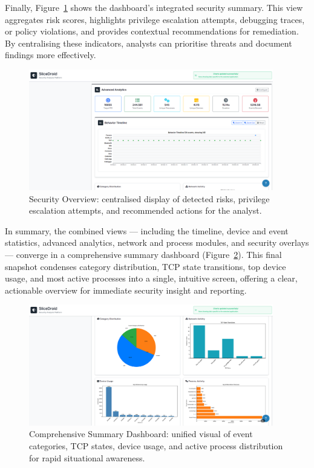 \documentclass[a4paper,12pt]{report}
\begin{document}
Finally, Figure~\ref{fig:security_overview} shows the dashboard’s integrated security summary. This view aggregates risk scores, highlights privilege escalation attempts, debugging traces, or policy violations, and provides contextual recommendations for remediation. By centralising these indicators, analysts can prioritise threats and document findings more effectively.

\begin{figure}[H]
\centering
\includegraphics[width=0.95\textwidth]{security_overview.png}
\caption{Security Overview: centralised display of detected risks, privilege escalation attempts, and recommended actions for the analyst.}
\label{fig:security_overview}
\end{figure}

In summary, the combined views — including the timeline, device and event statistics, advanced analytics, network and process modules, and security overlays — converge in a comprehensive summary dashboard (Figure~\ref{fig:summary_dashboard}). This final snapshot condenses category distribution, TCP state transitions, top device usage, and most active processes into a single, intuitive screen, offering a clear, actionable overview for immediate security insight and reporting.

\begin{figure}[H]
\centering
\includegraphics[width=0.95\textwidth]{security_overview-2.png.png}
\caption{Comprehensive Summary Dashboard: unified visual of event categories, TCP states, device usage, and active process distribution for rapid situational awareness.}
\label{fig:summary_dashboard}
\end{figure}
\end{document}
